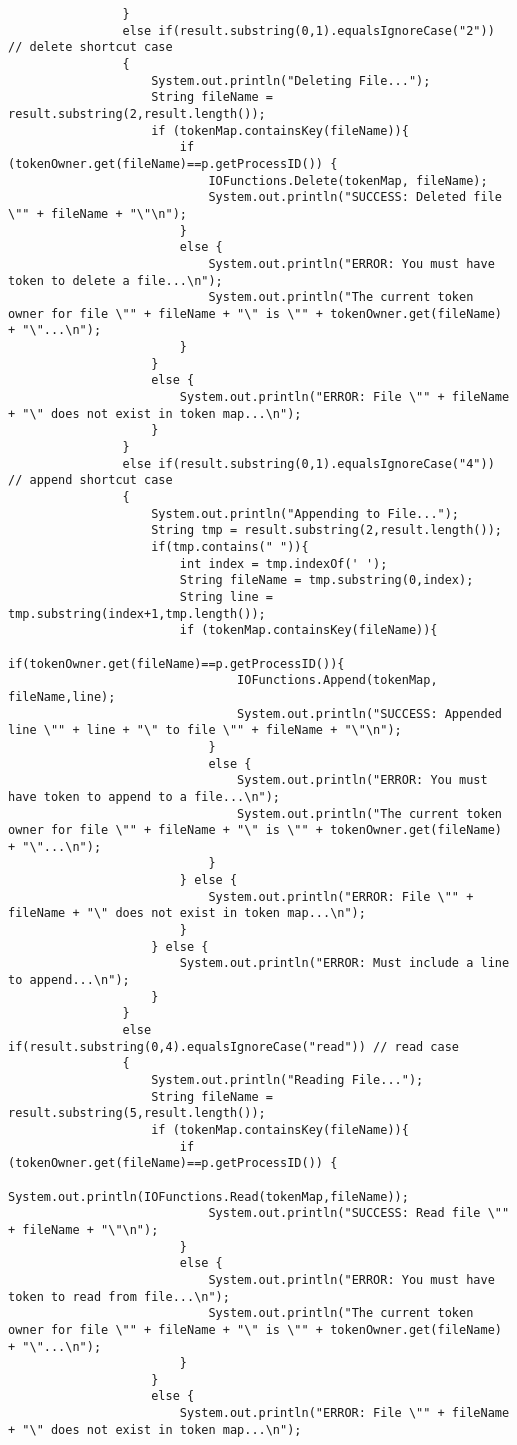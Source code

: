 \documentclass{article}
\begin{document}
\begin{lstlisting}
				}
				else if(result.substring(0,1).equalsIgnoreCase("2")) // delete shortcut case
				{
					System.out.println("Deleting File...");
					String fileName = result.substring(2,result.length());
					if (tokenMap.containsKey(fileName)){
						if (tokenOwner.get(fileName)==p.getProcessID()) {
							IOFunctions.Delete(tokenMap, fileName);
							System.out.println("SUCCESS: Deleted file \"" + fileName + "\"\n");
						}
						else {
							System.out.println("ERROR: You must have token to delete a file...\n");
							System.out.println("The current token owner for file \"" + fileName + "\" is \"" + tokenOwner.get(fileName) + "\"...\n");
						}
					}
					else {
						System.out.println("ERROR: File \"" + fileName + "\" does not exist in token map...\n");
					}
				}
				else if(result.substring(0,1).equalsIgnoreCase("4")) // append shortcut case
				{
					System.out.println("Appending to File...");
					String tmp = result.substring(2,result.length());
					if(tmp.contains(" ")){
						int index = tmp.indexOf(' ');
						String fileName = tmp.substring(0,index);
						String line = tmp.substring(index+1,tmp.length());
						if (tokenMap.containsKey(fileName)){
							if(tokenOwner.get(fileName)==p.getProcessID()){
								IOFunctions.Append(tokenMap, fileName,line);
								System.out.println("SUCCESS: Appended line \"" + line + "\" to file \"" + fileName + "\"\n");
							}
							else {
								System.out.println("ERROR: You must have token to append to a file...\n");
								System.out.println("The current token owner for file \"" + fileName + "\" is \"" + tokenOwner.get(fileName) + "\"...\n");
							}
						} else {
							System.out.println("ERROR: File \"" + fileName + "\" does not exist in token map...\n");
						}
					} else {
						System.out.println("ERROR: Must include a line to append...\n");
					}
				}
				else if(result.substring(0,4).equalsIgnoreCase("read")) // read case
				{
					System.out.println("Reading File...");
					String fileName = result.substring(5,result.length());
					if (tokenMap.containsKey(fileName)){
						if (tokenOwner.get(fileName)==p.getProcessID()) {
							System.out.println(IOFunctions.Read(tokenMap,fileName));
							System.out.println("SUCCESS: Read file \"" + fileName + "\"\n");
						}
						else {
							System.out.println("ERROR: You must have token to read from file...\n");
							System.out.println("The current token owner for file \"" + fileName + "\" is \"" + tokenOwner.get(fileName) + "\"...\n");
						}
					}
					else {
						System.out.println("ERROR: File \"" + fileName + "\" does not exist in token map...\n");

\end{lstlisting}
\end{document}
